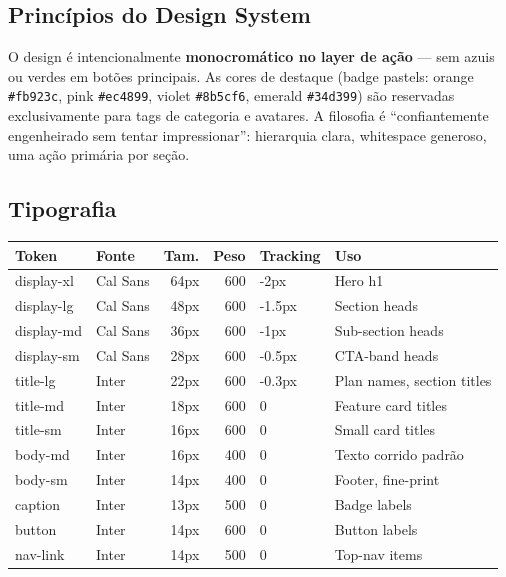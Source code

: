 \documentclass[a4paper,12pt,oneside]{article}
\begin{document}
\subsection{Princípios do Design System}

O design é intencionalmente \textbf{monocromático no layer de ação} --- sem azuis ou verdes em botões principais. As cores de destaque (badge pastels: orange \texttt{\#fb923c}, pink \texttt{\#ec4899}, violet \texttt{\#8b5cf6}, emerald \texttt{\#34d399}) são reservadas exclusivamente para tags de categoria e avatares. A filosofia é ``confiantemente engenheirado sem tentar impressionar'': hierarquia clara, whitespace generoso, uma ação primária por seção.

\subsection{Tipografia}

\begin{table}[H]
\centering
\small
\begin{tabularx}{\textwidth}{l l r r l l}
\toprule
\textbf{Token} & \textbf{Fonte} & \textbf{Tam.} & \textbf{Peso} & \textbf{Tracking} & \textbf{Uso} \\
\midrule
display-xl & Cal Sans & 64px & 600 & -2px & Hero h1 \\
display-lg & Cal Sans & 48px & 600 & -1.5px & Section heads \\
display-md & Cal Sans & 36px & 600 & -1px & Sub-section heads \\
display-sm & Cal Sans & 28px & 600 & -0.5px & CTA-band heads \\
title-lg & Inter & 22px & 600 & -0.3px & Plan names, section titles \\
title-md & Inter & 18px & 600 & 0 & Feature card titles \\
title-sm & Inter & 16px & 600 & 0 & Small card titles \\
body-md & Inter & 16px & 400 & 0 & Texto corrido padrão \\
body-sm & Inter & 14px & 400 & 0 & Footer, fine-print \\
caption & Inter & 13px & 500 & 0 & Badge labels \\
button & Inter & 14px & 600 & 0 & Button labels \\
nav-link & Inter & 14px & 500 & 0 & Top-nav items \\
\bottomrule
\end{tabularx}
\end{table}
\end{document}
